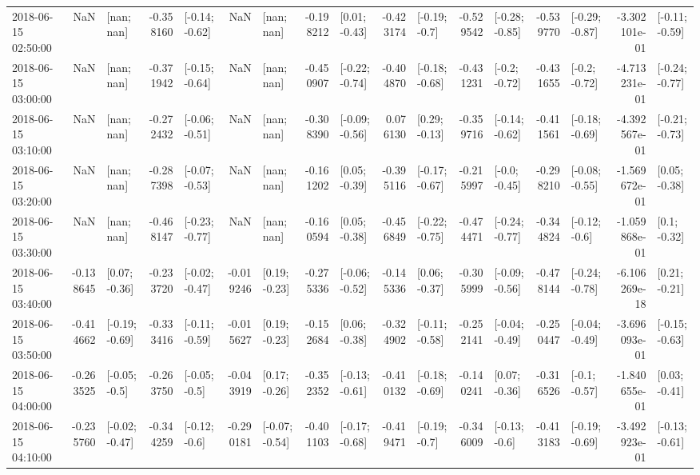 \begin{tabular}{lrlrlrlrlrlrlrlrl}
2018-06-15 02:50:00 &       NaN &      [nan; nan] & -0.358160 &  [-0.14; -0.62] &       NaN &      [nan; nan] & -0.198212 &   [0.01; -0.43] & -0.423174 &   [-0.19; -0.7] & -0.529542 &  [-0.28; -0.85] & -0.539770 &  [-0.29; -0.87] & -3.302101e-01 &  [-0.11; -0.59] \\
2018-06-15 03:00:00 &       NaN &      [nan; nan] & -0.371942 &  [-0.15; -0.64] &       NaN &      [nan; nan] & -0.450907 &  [-0.22; -0.74] & -0.404870 &  [-0.18; -0.68] & -0.431231 &   [-0.2; -0.72] & -0.431655 &   [-0.2; -0.72] & -4.713231e-01 &  [-0.24; -0.77] \\
2018-06-15 03:10:00 &       NaN &      [nan; nan] & -0.272432 &  [-0.06; -0.51] &       NaN &      [nan; nan] & -0.308390 &  [-0.09; -0.56] &  0.076130 &   [0.29; -0.13] & -0.359716 &  [-0.14; -0.62] & -0.411561 &  [-0.18; -0.69] & -4.392567e-01 &  [-0.21; -0.73] \\
2018-06-15 03:20:00 &       NaN &      [nan; nan] & -0.287398 &  [-0.07; -0.53] &       NaN &      [nan; nan] & -0.161202 &   [0.05; -0.39] & -0.395116 &  [-0.17; -0.67] & -0.215997 &   [-0.0; -0.45] & -0.298210 &  [-0.08; -0.55] & -1.569672e-01 &   [0.05; -0.38] \\
2018-06-15 03:30:00 &       NaN &      [nan; nan] & -0.468147 &  [-0.23; -0.77] &       NaN &      [nan; nan] & -0.160594 &   [0.05; -0.38] & -0.456849 &  [-0.22; -0.75] & -0.474471 &  [-0.24; -0.77] & -0.344824 &   [-0.12; -0.6] & -1.059868e-01 &    [0.1; -0.32] \\
2018-06-15 03:40:00 & -0.138645 &   [0.07; -0.36] & -0.233720 &  [-0.02; -0.47] & -0.019246 &   [0.19; -0.23] & -0.275336 &  [-0.06; -0.52] & -0.145336 &   [0.06; -0.37] & -0.305999 &  [-0.09; -0.56] & -0.478144 &  [-0.24; -0.78] & -6.106269e-18 &   [0.21; -0.21] \\
2018-06-15 03:50:00 & -0.414662 &  [-0.19; -0.69] & -0.333416 &  [-0.11; -0.59] & -0.015627 &   [0.19; -0.23] & -0.152684 &   [0.06; -0.38] & -0.324902 &  [-0.11; -0.58] & -0.252141 &  [-0.04; -0.49] & -0.250447 &  [-0.04; -0.49] & -3.696093e-01 &  [-0.15; -0.63] \\
2018-06-15 04:00:00 & -0.263525 &   [-0.05; -0.5] & -0.263750 &   [-0.05; -0.5] & -0.043919 &   [0.17; -0.26] & -0.352352 &  [-0.13; -0.61] & -0.410132 &  [-0.18; -0.69] & -0.140241 &   [0.07; -0.36] & -0.316526 &   [-0.1; -0.57] & -1.840655e-01 &   [0.03; -0.41] \\
2018-06-15 04:10:00 & -0.235760 &  [-0.02; -0.47] & -0.344259 &   [-0.12; -0.6] & -0.290181 &  [-0.07; -0.54] & -0.401103 &  [-0.17; -0.68] & -0.419471 &   [-0.19; -0.7] & -0.346009 &   [-0.13; -0.6] & -0.413183 &  [-0.19; -0.69] & -3.492923e-01 &  [-0.13; -0.61] \\

\end{tabular}
